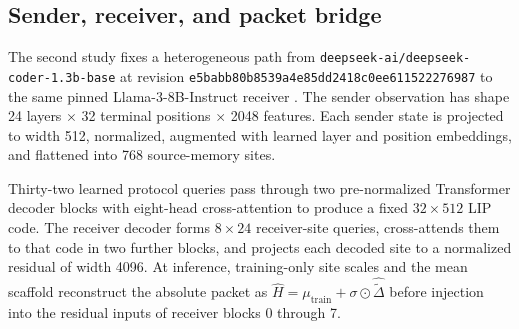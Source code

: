 \documentclass[11pt]{article}
\begin{document}
\subsection{Sender, receiver, and packet bridge}

The second study fixes a heterogeneous path from \texttt{deepseek-ai/deepseek-coder-1.3b-base} at revision \texttt{e5babb80b8539a4e85dd2418c0ee611522276987} to the same pinned Llama-3-8B-Instruct receiver \cite{grattafiori2024,guo2024}. The sender observation has shape 24 layers \(\times\) 32 terminal positions \(\times\) 2048 features. Each sender state is projected to width 512, normalized, augmented with learned layer and position embeddings, and flattened into 768 source-memory sites.

Thirty-two learned protocol queries pass through two pre-normalized Transformer decoder blocks with eight-head cross-attention to produce a fixed \(32 \times 512\) LIP code. The receiver decoder forms \(8 \times 24\) receiver-site queries, cross-attends them to that code in two further blocks, and projects each decoded site to a normalized residual of width 4096. At inference, training-only site scales and the mean scaffold reconstruct the absolute packet as \(\widehat H = \mu_{\mathrm{train}} + \sigma \odot \widehat{\widetilde\Delta}\) before injection into the residual inputs of receiver blocks 0 through 7.
\end{document}
